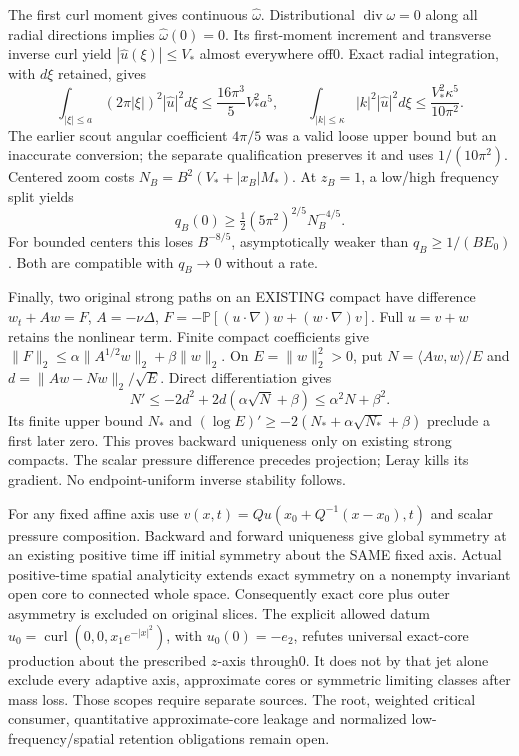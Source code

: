 \documentclass[11pt]{article}
\begin{document}
The first curl moment gives continuous $\widehat\omega$. Distributional
$\operatorname{div}\omega=0$ along all radial directions implies
$\widehat\omega(0)=0$. Its first-moment increment and transverse inverse
curl yield $|\widehat u(\xi)|\le V_*$ almost everywhere off0. Exact radial
integration, with $d\xi$ retained, gives
\[
 \int_{|\xi|\le a}(2\pi|\xi|)^2|\widehat u|^2d\xi
 \le\frac{16\pi^3}{5}V_*^2a^5,
 \qquad
 \int_{|k|\le\kappa}|k|^2|\widehat u|^2d\xi
 \le\frac{V_*^2\kappa^5}{10\pi^2}.
\]
The earlier scout angular coefficient $4\pi/5$ was a valid loose upper
bound but an inaccurate conversion; the separate qualification preserves
it and uses $1/(10\pi^2)$. Centered zoom costs
$N_B=B^2(V_*+|x_B|M_*)$. At $z_B=1$, a low/high frequency split yields
\[
 q_B(0)\ge\tfrac12(5\pi^2)^{2/5}N_B^{-4/5}.
\]
For bounded centers this loses $B^{-8/5}$, asymptotically weaker than
$q_B\ge1/(BE_0)$. Both are compatible with $q_B\to0$ without a rate.

Finally, two original strong paths on an EXISTING compact have difference
$w_t+Aw=F$, $A=-\nu\Delta$,
$F=-\mathbb P[(u\cdot\nabla)w+(w\cdot\nabla)v]$.
Full $u=v+w$ retains the nonlinear term. Finite compact coefficients give
$\|F\|_2\le\alpha\|A^{1/2}w\|_2+\beta\|w\|_2$.
On $E=\|w\|_2^2>0$, put $N=\langle Aw,w\rangle/E$ and
$d=\|Aw-Nw\|_2/\sqrt E$. Direct differentiation gives
\[
 N'\le-2d^2+2d(\alpha\sqrt N+\beta)
 \le\alpha^2N+\beta^2.
\]
Its finite upper bound $N_*$ and
$(\log E)'\ge-2(N_*+\alpha\sqrt{N_*}+\beta)$ preclude a first later zero.
This proves backward uniqueness only on existing strong compacts.
The scalar pressure difference precedes projection; Leray kills its gradient.
No endpoint-uniform inverse stability follows.

For any fixed affine axis use
$v(x,t)=Q u(x_0+Q^{-1}(x-x_0),t)$ and scalar pressure composition.
Backward and forward uniqueness give global symmetry at an existing
positive time iff initial symmetry about the SAME fixed axis.
Actual positive-time spatial analyticity extends exact symmetry on a
nonempty invariant open core to connected whole space. Consequently exact
core plus outer asymmetry is excluded on original slices. The explicit
allowed datum $u_0=\operatorname{curl}(0,0,x_1e^{-|x|^2})$, with
$u_0(0)=-e_2$, refutes universal exact-core production about the prescribed
$z$-axis through0. It does not by that jet alone exclude every adaptive axis,
approximate cores or symmetric limiting classes after mass loss.
Those scopes require separate sources. The root, weighted critical consumer,
quantitative approximate-core leakage and normalized low-frequency/spatial
retention obligations remain open.
\end{document}
